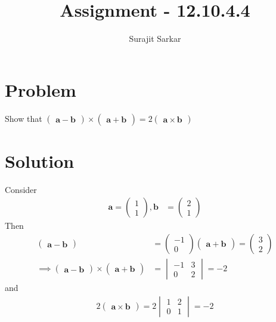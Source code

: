 \documentclass[journal,12pt,twocolumn]{IEEEtran}
\title{\mytitle}
\title{
Assignment - 12.10.4.4
}
\author{Surajit Sarkar}
\newcommand{\myvec}[1]{\ensuremath{\begin{pmatrix}#1\end{pmatrix}}}
\newcommand{\mydet}[1]{\ensuremath{\begin{vmatrix}#1\end{vmatrix}}}
\let\vec\mathbf
\begin{document}
\maketitle
\tableofcontents
\bigskip
\section{\textbf{Problem}}
Show that $\myvec{\vec{a}-\vec{b}}\times\myvec{\vec{a}+\vec{b}}=2\myvec{\vec{a}\times\vec{b}}$
\section{\textbf{Solution}}
\fi
Consider
\begin{align}
\vec{a}=\myvec{1\\1},\vec{b}&=\myvec{2\\1}
\end{align}
Then
  \begin{align}
  \myvec{\vec{a}-\vec{b}}&=\myvec{-1\\0}
  \myvec{\vec{a}+\vec{b}}=\myvec{3\\2}\\
\implies \myvec{\vec{a}-\vec{b}}\times\myvec{\vec{a}+\vec{b}}
  &=\mydet{-1 & 3\\0 & 2} 
  =-2
\end{align}
and 
\begin{align}
  2\myvec{\vec{a}\times\vec{b}}
  =2\mydet{1 & 2\\0 & 1}
  =-2
  \end{align}
\end{document}

